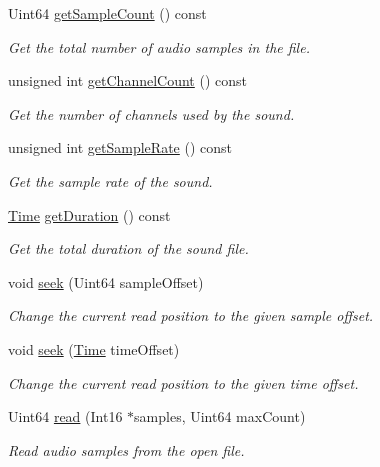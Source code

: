 \begin{DoxyCompactItemize}
Uint64 \hyperlink{classsf_1_1_input_sound_file_a665b7fed6cdca3e0c622909e5a6655e4}{get\+Sample\+Count} () const
\begin{DoxyCompactList}\small\item\em Get the total number of audio samples in the file. \end{DoxyCompactList}\item 
unsigned int \hyperlink{classsf_1_1_input_sound_file_a54307c308ba05dea63aba54a29c804a4}{get\+Channel\+Count} () const
\begin{DoxyCompactList}\small\item\em Get the number of channels used by the sound. \end{DoxyCompactList}\item 
unsigned int \hyperlink{classsf_1_1_input_sound_file_a6b8177e40dd8020752f6d52f96b774c3}{get\+Sample\+Rate} () const
\begin{DoxyCompactList}\small\item\em Get the sample rate of the sound. \end{DoxyCompactList}\item 
\hyperlink{classsf_1_1_time}{Time} \hyperlink{classsf_1_1_input_sound_file_aa081bd4d9732408d10b48227a360778e}{get\+Duration} () const
\begin{DoxyCompactList}\small\item\em Get the total duration of the sound file. \end{DoxyCompactList}\item 
void \hyperlink{classsf_1_1_input_sound_file_aaf97be15020a42e159ff88f76f22af20}{seek} (Uint64 sample\+Offset)
\begin{DoxyCompactList}\small\item\em Change the current read position to the given sample offset. \end{DoxyCompactList}\item 
void \hyperlink{classsf_1_1_input_sound_file_a8eee7af58ad75ddc61f93ad72e2d66c1}{seek} (\hyperlink{classsf_1_1_time}{Time} time\+Offset)
\begin{DoxyCompactList}\small\item\em Change the current read position to the given time offset. \end{DoxyCompactList}\item 
Uint64 \hyperlink{classsf_1_1_input_sound_file_a83d6f64617456601edeb0daf9d14a17f}{read} (Int16 $\ast$samples, Uint64 max\+Count)
\begin{DoxyCompactList}\small\item\em Read audio samples from the open file. \end{DoxyCompactList}\end{DoxyCompactItemize}


